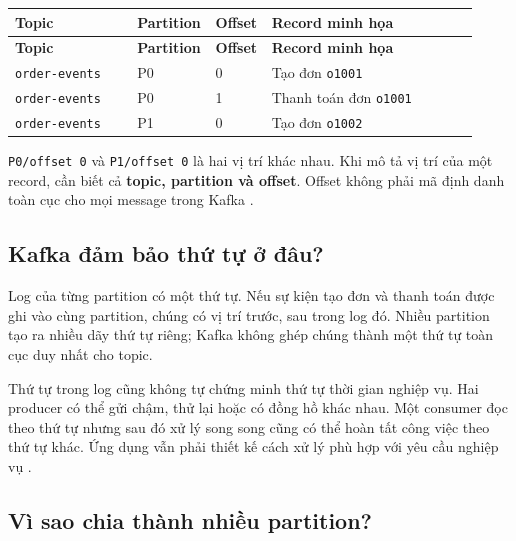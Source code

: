 \begingroup\small
\renewcommand{\arraystretch}{1.23}
\begin{longtable}{@{}p{0.26\linewidth}p{0.12\linewidth}p{0.1\linewidth}p{0.44\linewidth}@{}}
\toprule
\rowcolor{rowLavender}
\textbf{Topic} & \textbf{Partition} & \textbf{Offset} & \textbf{Record minh họa} \\
\midrule
\endfirsthead
\toprule
\rowcolor{rowLavender}
\textbf{Topic} & \textbf{Partition} & \textbf{Offset} & \textbf{Record minh họa} \\
\midrule
\endhead
\bottomrule
\endfoot
\texttt{order-\allowbreak{}events} & P0 & 0 & Tạo đơn \texttt{o1001} \\
\texttt{order-\allowbreak{}events} & P0 & 1 & Thanh toán đơn \texttt{o1001} \\
\texttt{order-\allowbreak{}events} & P1 & 0 & Tạo đơn \texttt{o1002} \\
\end{longtable}
\endgroup

\texttt{P0/\allowbreak{}offset 0} và \texttt{P1/\allowbreak{}offset 0} là hai vị trí khác nhau. Khi mô tả vị trí của một record, cần biết cả \textbf{topic, partition và offset}. Offset không phải mã định danh toàn cục cho mọi message trong Kafka \cite{kafka-log}.


\FloatBarrier
{}
\subsection{Kafka đảm bảo thứ tự ở đâu?}

Log của từng partition có một thứ tự. Nếu sự kiện tạo đơn và thanh toán được ghi vào cùng partition, chúng có vị trí trước, sau trong log đó. Nhiều partition tạo ra nhiều dãy thứ tự riêng; Kafka không ghép chúng thành một thứ tự toàn cục duy nhất cho topic.


Thứ tự trong log cũng không tự chứng minh thứ tự thời gian nghiệp vụ. Hai producer có thể gửi chậm, thử lại hoặc có đồng hồ khác nhau. Một consumer đọc theo thứ tự nhưng sau đó xử lý song song cũng có thể hoàn tất công việc theo thứ tự khác. Ứng dụng vẫn phải thiết kế cách xử lý phù hợp với yêu cầu nghiệp vụ \cite{kafka-design, kafka-consumer-api}.


\FloatBarrier
{}
\subsection{Vì sao chia thành nhiều partition?}

